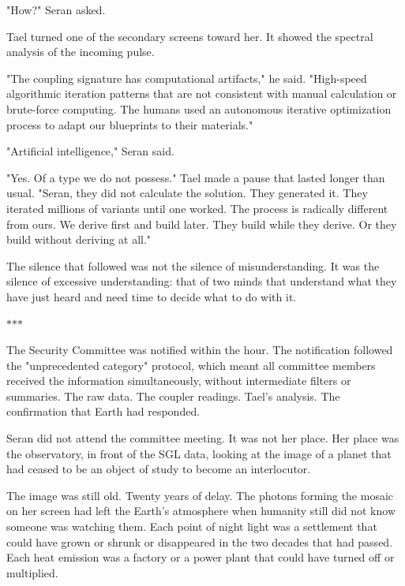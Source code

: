 \documentclass[11pt,a5paper,twoside]{book}
\begin{document}
"How?" Seran asked.

Tael turned one of the secondary screens toward her. It showed the spectral analysis of the incoming pulse.

"The coupling signature has computational artifacts," he said. "High-speed algorithmic iteration patterns that are not consistent with manual calculation or brute-force computing. The humans used an autonomous iterative optimization process to adapt our blueprints to their materials."

"Artificial intelligence," Seran said.

"Yes. Of a type we do not possess." Tael made a pause that lasted longer than usual. "Seran, they did not calculate the solution. They generated it. They iterated millions of variants until one worked. The process is radically different from ours. We derive first and build later. They build while they derive. Or they build without deriving at all."

The silence that followed was not the silence of misunderstanding. It was the silence of excessive understanding: that of two minds that understand what they have just heard and need time to decide what to do with it.

\vspace{1.5em}
\begin{center}$\ast$\quad$\ast$\quad$\ast$\end{center}
\vspace{1.5em}

The Security Committee was notified within the hour. The notification followed the "unprecedented category" protocol, which meant all committee members received the information simultaneously, without intermediate filters or summaries. The raw data. The coupler readings. Tael's analysis. The confirmation that Earth had responded.

Seran did not attend the committee meeting. It was not her place. Her place was the observatory, in front of the SGL data, looking at the image of a planet that had ceased to be an object of study to become an interlocutor.

The image was still old. Twenty years of delay. The photons forming the mosaic on her screen had left the Earth's atmosphere when humanity still did not know someone was watching them. Each point of night light was a settlement that could have grown or shrunk or disappeared in the two decades that had passed. Each heat emission was a factory or a power plant that could have turned off or multiplied.
\end{document}
